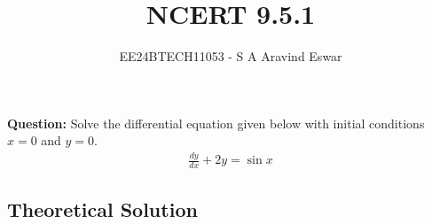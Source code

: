 \documentclass[journal]{IEEEtran}
\begin{document}

\vspace{3cm}

\title{NCERT 9.5.1}
\author{EE24BTECH11053 - S A Aravind Eswar}
{\let\newpage\relax\maketitle}

\renewcommand{\thefigure}{\theenumi}
\renewcommand{\thetable}{\theenumi}
\setlength{\intextsep}{10pt} %

\textbf{Question:} Solve the differential equation given below with initial conditions $ x = 0 $ and $ y = 0 $.
\begin{align}
	\frac{dy}{dx} + 2y = \sin{x}
\end{align}
\subsection{Theoretical Solution}


    


\end{document}
